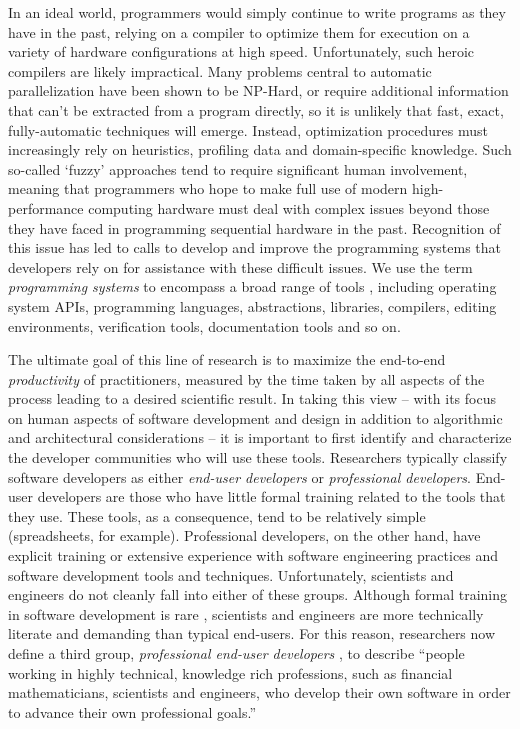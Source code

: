 \documentclass[12pt]{article}
\begin{document}
In an ideal world, programmers would simply continue to write programs as they have in the past, relying on a compiler to optimize them for execution on a variety of hardware configurations at high speed. Unfortunately, such heroic compilers are likely impractical. Many problems central to automatic parallelization have been shown to be NP-Hard, or require additional information that can't be extracted from a program directly, so it is unlikely that fast, exact, fully-automatic techniques will emerge. Instead, optimization procedures must increasingly rely on heuristics, profiling data and domain-specific knowledge. Such so-called `fuzzy' approaches tend to require significant human involvement, meaning that programmers who hope to make full use of modern high-performance computing hardware must deal with complex issues beyond those they have faced in programming sequential hardware in the past. Recognition of this issue has led to calls to develop and improve the programming systems that developers rely on for assistance with these difficult issues. We use the term {\it programming systems} to encompass a broad range of tools
, including operating system APIs, programming languages, abstractions, libraries, compilers, editing environments, verification tools, documentation tools and so on.

The ultimate goal of this line of research is to maximize the end-to-end {\it productivity} of practitioners, measured by the time taken by all aspects of the process leading to a desired scientific result. In taking this view -- with its focus on human aspects of software development and design in addition to algorithmic and architectural considerations -- it is important to first identify and characterize the developer communities who will use these tools. Researchers typically classify software developers as either {\it end-user developers} or {\it professional developers}. End-user developers are those who have little formal training related to the tools that they use. These tools, as a consequence, tend to be relatively simple (spreadsheets, for example). Professional developers, on the other hand, have explicit training or extensive experience with software engineering practices and software development tools and techniques. Unfortunately, scientists and engineers do not cleanly fall into either of these groups. Although formal training in software development is rare \cite{oai:open.ac.uk.OAI2:17673}, scientists and engineers are more technically literate and demanding than typical end-users. For this reason, researchers now define a third group, {\it professional end-user developers} \cite{segal2007some}, to describe ``people working in highly technical, knowledge rich professions, such as financial mathematicians, scientists and engineers, who develop their own software in order to advance their own professional goals.'' 
\end{document}
